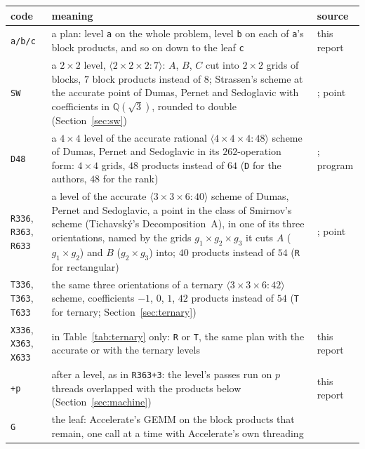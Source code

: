 \documentclass[11pt]{article}
\newcommand{\mm}[1]{\langle #1\rangle}
\newcommand{\lv}[1]{\texttt{#1}}
\begin{document}
\begin{table}[!tbp]
\centering\footnotesize
\begin{tabular}{@{}l p{} >{\raggedright\arraybackslash}p{}@{}}
\toprule
code & meaning & source\\
\midrule
\lv{a/b/c} & a plan: level \lv{a} on the whole problem, level \lv{b} on each of
  \lv{a}'s block products, and so on down to the leaf \lv{c} & this report\\
\addlinespace
\lv{SW} & a $2\times2$ level, $\mm{2\times2\times2:7}$: $A$, $B$, $C$ cut into
  $2\times2$ grids of blocks, $7$ block products instead of $8$; Strassen's
  scheme at the accurate point of Dumas, Pernet and Sedoglavic with
  coefficients in $\mathbb{Q}(\sqrt3)$, rounded to double (Section~\ref{sec:sw})
  & \cite{Strassen69}; point \cite[Eq.~(36)]{DPS24}\\
\lv{D48} & a $4\times4$ level of the accurate rational
  $\mm{4\times4\times4:48}$ scheme of Dumas, Pernet and Sedoglavic in its
  $262$-operation form: $4\times4$ grids, $48$ products instead of $64$
  (\lv{D} for the authors, $48$ for the rank)
  & \cite{DPS25,DPS26a}; program \cite{PLinOpt,S26b}\\
\lv{R336}, \lv{R363}, \lv{R633} & a level of the accurate
  $\mm{3\times3\times6:40}$ scheme of Dumas, Pernet and Sedoglavic, a point
  in the class of Smirnov's scheme (Tichavsk\'y's Decomposition~A), in one
  of its three orientations, named by
  the grids $g_1\times g_2\times g_3$ it cuts $A$ ($g_1\times g_2$) and $B$
  ($g_2\times g_3$) into; $40$ products instead of $54$ (\lv{R} for
  rectangular) & \cite{Smirnov13}; point \cite{Tichavsky21,DPS26b,PLinOpt}\\
\lv{T336}, \lv{T363}, \lv{T633} & the same three orientations of a ternary
  $\mm{3\times3\times6:42}$ scheme, coefficients $-1$, $0$, $1$, $42$ products
  instead of $54$ (\lv{T} for ternary; Section~\ref{sec:ternary})
  & \cite{Perminov,Perminov25}\\
\lv{X336}, \lv{X363}, \lv{X633} & in Table~\ref{tab:ternary} only: \lv{R} or
  \lv{T}, the same plan with the accurate or with the ternary levels
  & this report\\
\addlinespace
\lv{+p} & after a level, as in \lv{R363+3}: the level's passes run on $p$
  threads overlapped with the products below (Section~\ref{sec:machine})
  & this report \cite{logic}\\
\addlinespace
\lv{G} & the leaf: Accelerate's GEMM on the block products that remain, one
  call at a time with Accelerate's own threading & \cite{Accelerate}\\

\end{tabular}
\end{table}
\end{document}
